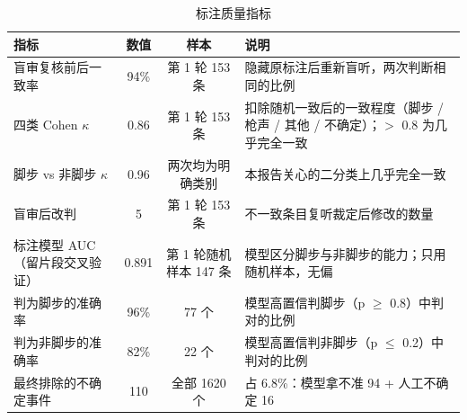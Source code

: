 \begin{table}[htbp]\centering
\caption{标注质量指标}\label{tab:quality}
{\small\begin{threeparttable}
\begin{tabularx}{\linewidth}{lccL}\toprule
指标 & 数值 & 样本 & 说明 \\
\midrule
盲审复核前后一致率 & 94\% & 第 1 轮 153 条 & 隐藏原标注后重新盲听，两次判断相同的比例 \\
四类 Cohen $\kappa$ & 0.86 & 第 1 轮 153 条 & 扣除随机一致后的一致程度（脚步 / 枪声 / 其他 / 不确定）；$>$ 0.8 为几乎完全一致 \\
脚步 vs 非脚步 $\kappa$ & 0.96 & 两次均为明确类别 & 本报告关心的二分类上几乎完全一致 \\
盲审后改判 & 5 & 第 1 轮 153 条 & 不一致条目复听裁定后修改的数量 \\
标注模型 AUC（留片段交叉验证） & 0.891 & 第 1 轮随机样本 147 条 & 模型区分脚步与非脚步的能力；只用随机样本，无偏 \\
判为脚步的准确率 & 96\% & 77 个 & 模型高置信判脚步（p $\geq$ 0.8）中判对的比例 \\
判为非脚步的准确率 & 82\% & 22 个 & 模型高置信判非脚步（p $\leq$ 0.2）中判对的比例 \\
最终排除的不确定事件 & 110 & 全部 1620 个 & 占 6.8\%：模型拿不准 94 + 人工不确定 16 \\
\bottomrule\end{tabularx}
\end{threeparttable}}
\end{table}
